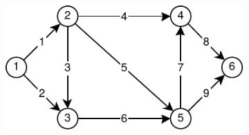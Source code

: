 \begin{savenotes}
	\begin{figure}[!htbp]
		\centering
		\null\hfill
		\begin{subfigure}[b]{0.45\textwidth}
			\includegraphics[width=\textwidth]{Chapter_I/ADJACENCY-MATRIX-Example/a.pdf}
			\caption{}
			\label{fig:adjacencyMatrix:a}
		\end{subfigure}
		\hfill
		\begin{subfigure}[b]{0.09\textwidth}

\end{subfigure}
\end{figure}
\end{savenotes}
